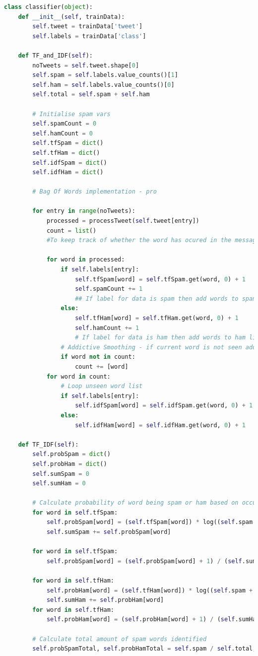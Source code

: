 \documentclass[oneside, 12pt]{article}
\begin{document}
		\begin{lstlisting}[language=python, caption=classifer class of spam\_filter.py]
class classifier(object):
	def __init__(self, trainData):
		self.tweet = trainData['tweet']
		self.labels = trainData['class']

	def TF_and_IDF(self):
		noTweets = self.tweet.shape[0]
		self.spam = self.labels.value_counts()[1]
		self.ham = self.labels.value_counts()[0]
		self.total = self.spam + self.ham

		# Initialise spam vars
		self.spamCount = 0
		self.hamCount = 0
		self.tfSpam = dict()
		self.tfHam = dict()
		self.idfSpam = dict()
		self.idfHam = dict()

		# Bag Of Words implementation - pro

		for entry in range(noTweets):
			processed = processTweet(self.tweet[entry])
			count = list() 
			#To keep track of whether the word has ocured in the message or not. IDF count

			for word in processed:
				if self.labels[entry]:
					self.tfSpam[word] = self.tfSpam.get(word, 0) + 1
					self.spamCount += 1	
					## If label for data is spam then add words to spam list
				else:
					self.tfHam[word] = self.tfHam.get(word, 0) + 1
					self.hamCount += 1
					# If label for data is ham then add words to ham list
				# Addictive Smoothing - if current word is not seen add count list
				if word not in count:
					count += [word]
			for word in count:
				# Loop unseen word list
				if self.labels[entry]:
					self.idfSpam[word] = self.idfSpam.get(word, 0) + 1
				else:
					self.idfHam[word] = self.idfHam.get(word, 0) + 1

	def TF_IDF(self):
		self.probSpam = dict()
		self.probHam = dict()
		self.sumSpam = 0
		self.sumHam = 0
		
		# Calculate probability of word being spam or ham based on occurance in text compared to counted sets along with relevant keys
		for word in self.tfSpam:
			self.probSpam[word] = (self.tfSpam[word]) * log((self.spam + self.ham) / (self.idfSpam[word] + self.idfHam.get(word, 0)))
			self.sumSpam += self.probSpam[word]
			
		for word in self.tfSpam:
			self.probSpam[word] = (self.probSpam[word] + 1) / (self.sumSpam + len(list(self.probSpam.keys())))
		
		for word in self.tfHam:
			self.probHam[word] = (self.tfHam[word]) * log((self.spam + self.ham) / (self.idfSpam.get(word, 0) + self.idfHam[word]))
			self.sumHam += self.probHam[word]
		for word in self.tfHam:
			self.probHam[word] = (self.probHam[word] + 1) / (self.sumHam + len(list(self.probHam.keys())))
			
		# Calculate total amount of spam words identified
		self.probSpamTotal, self.probHamTotal = self.spam / self.total, self.ham / self.total
		\end{lstlisting}
		
\end{document}
